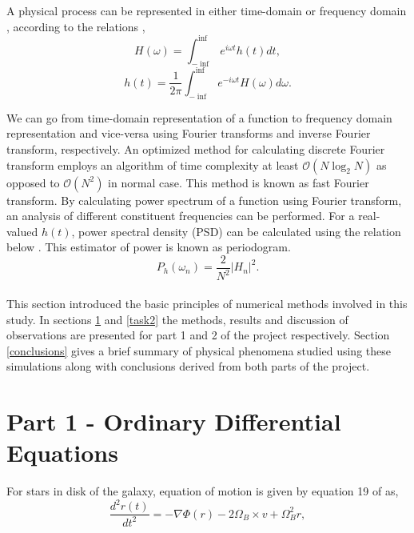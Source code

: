 \documentclass[a4paper]{article}
\begin{document}
	A physical process can be represented in either time-domain or frequency domain \cite{press_numerical_1992}, according to the relations \cite{lecture_4},
	\begin{equation}
		H(\omega) = \int_{-\inf}^{\inf} e^{i \omega t} h(t) dt,
		\label{eq:fourier_transform}
	\end{equation}
	\begin{equation}
		h(t) = \frac{1}{2\pi} \int_{-\inf}^{\inf} e^{-i \omega t} H(\omega) d\omega .
	\end{equation}

	We can go from time-domain representation of a function to frequency domain representation and vice-versa using Fourier transforms and inverse Fourier transform, respectively. An optimized method for calculating discrete Fourier transform employs an algorithm of time complexity at least \(\mathcal{O}(N \log_2N)\) as opposed to \(\mathcal{O}(N^2)\) in normal case. This method is known as fast Fourier transform. By calculating power spectrum of a function using Fourier transform, an analysis of different constituent frequencies can be performed. For a real-valued \(h(t)\), power spectral density (PSD) can be calculated using the relation below \cite{lecture_4}. This estimator of power is known as periodogram.
	\begin{equation}
		P_h(\omega_n) = \frac{2}{N^2} |H_n|^2.
		\label{eq:psd}
	\end{equation}
	\\
	
	This section introduced the basic principles of numerical methods involved in this study. In sections \ref{task1} and \ref{task2} the methods, results and discussion of observations are presented for part 1 and 2 of the project respectively. Section \ref{conclusions} gives a brief summary of physical phenomena studied using these simulations along with conclusions derived from both parts of the project.
	
	
	\newpage
	\section{Part 1 - Ordinary Differential Equations} \label{task1}
	
	For stars in disk of the galaxy, equation of motion is given by equation 19 of \cite{lecture_3} as,
	\begin{equation}
		\frac{d^2r(t)}{dt^2} = - \nabla \Phi (r) -2 \Omega_B \times v+ \Omega_B^2 r ,
		\label{eq:motion1}
	\end{equation}
	
\end{document}
